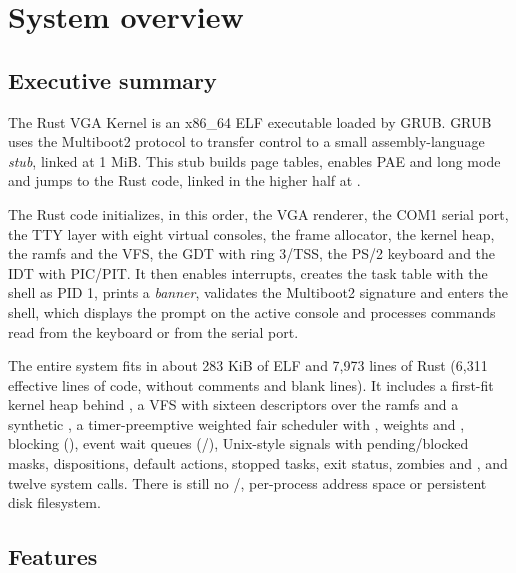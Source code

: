 \chapter{System overview}
\label{cap:visao}

\section{Executive summary}

The Rust VGA Kernel is an x86\_64 ELF executable loaded by GRUB. GRUB uses
the Multiboot2 protocol to transfer control to a small assembly-language
\emph{stub}, linked at 1 MiB. This stub builds page tables, enables PAE and
long mode and jumps to the Rust code, linked in the higher half at
.

The Rust code initializes, in this order, the VGA renderer, the COM1 serial
port, the TTY layer with eight virtual consoles, the frame allocator, the
kernel heap, the ramfs and the VFS, the GDT with ring 3/TSS, the PS/2
keyboard and the IDT with PIC/PIT. It then enables interrupts, creates the
task table with the shell as PID 1, prints a \emph{banner}, validates the
Multiboot2 signature and enters the shell, which displays the prompt
 on the active console and processes commands read from the
keyboard or from the serial port.

The entire system fits in about 283 KiB of ELF and 7,973 lines of Rust
(6,311 effective lines of code, without comments and blank lines). It
includes a first-fit kernel heap behind , a VFS
with sixteen descriptors over the ramfs and a synthetic , a
timer-preemptive weighted fair scheduler with , weights and
, blocking  (), event
wait queues (/), Unix-style signals with
pending/blocked masks, dispositions, default actions, stopped tasks, exit
status, zombies and , and twelve system calls. There is still no
/, per-process address space or persistent disk
filesystem.

\section{Features}

